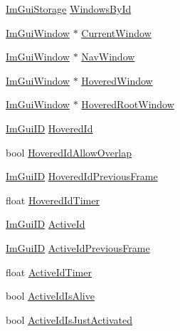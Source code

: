 \begin{DoxyCompactItemize}
\item 
\mbox{\hyperlink{struct_im_gui_storage}{Im\+Gui\+Storage}} \mbox{\hyperlink{struct_im_gui_context_adc1e46e1c1582a0f0eb74d957efedf98}{Windows\+By\+Id}}
\item 
\mbox{\hyperlink{struct_im_gui_window}{Im\+Gui\+Window}} $\ast$ \mbox{\hyperlink{struct_im_gui_context_aa923044f396241668aef5ed2f4c4d847}{Current\+Window}}
\item 
\mbox{\hyperlink{struct_im_gui_window}{Im\+Gui\+Window}} $\ast$ \mbox{\hyperlink{struct_im_gui_context_ae06077e45c894488b28baaf2d7ff8e41}{Nav\+Window}}
\item 
\mbox{\hyperlink{struct_im_gui_window}{Im\+Gui\+Window}} $\ast$ \mbox{\hyperlink{struct_im_gui_context_a6dd89693704216a036d2676b8c6610f8}{Hovered\+Window}}
\item 
\mbox{\hyperlink{struct_im_gui_window}{Im\+Gui\+Window}} $\ast$ \mbox{\hyperlink{struct_im_gui_context_ae5dcb8bed41ff948af2cfba6c9ae36d9}{Hovered\+Root\+Window}}
\item 
\mbox{\hyperlink{imgui_8h_a1785c9b6f4e16406764a85f32582236f}{Im\+Gui\+ID}} \mbox{\hyperlink{struct_im_gui_context_a32bef5a7740179ad8076643b001f15e4}{Hovered\+Id}}
\item 
bool \mbox{\hyperlink{struct_im_gui_context_a171f67ac705994d413a0bccf491aa4e1}{Hovered\+Id\+Allow\+Overlap}}
\item 
\mbox{\hyperlink{imgui_8h_a1785c9b6f4e16406764a85f32582236f}{Im\+Gui\+ID}} \mbox{\hyperlink{struct_im_gui_context_a08742c14087e26304ff47fb9212d8eb6}{Hovered\+Id\+Previous\+Frame}}
\item 
float \mbox{\hyperlink{struct_im_gui_context_a07a6bd929503077394ea0f80965470f9}{Hovered\+Id\+Timer}}
\item 
\mbox{\hyperlink{imgui_8h_a1785c9b6f4e16406764a85f32582236f}{Im\+Gui\+ID}} \mbox{\hyperlink{struct_im_gui_context_a11c874eb6cf74ba9162bd1d01c4ccbcc}{Active\+Id}}
\item 
\mbox{\hyperlink{imgui_8h_a1785c9b6f4e16406764a85f32582236f}{Im\+Gui\+ID}} \mbox{\hyperlink{struct_im_gui_context_af58aa479f6c97819694f1709b62c70d8}{Active\+Id\+Previous\+Frame}}
\item 
float \mbox{\hyperlink{struct_im_gui_context_a9deb2b22abfb5a4fd306371b19e2b9c4}{Active\+Id\+Timer}}
\item 
bool \mbox{\hyperlink{struct_im_gui_context_a3b28802a3a394f032264d36d5a5a00e0}{Active\+Id\+Is\+Alive}}
\item 
bool \mbox{\hyperlink{struct_im_gui_context_aa539096bf2b0ab28e0dbf73d595c64d8}{Active\+Id\+Is\+Just\+Activated}}

\end{DoxyCompactItemize}
